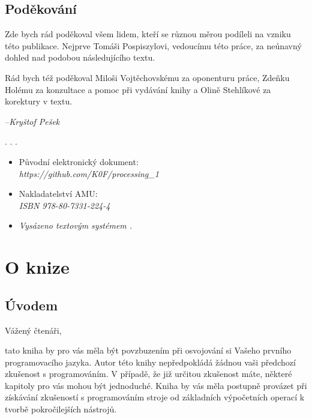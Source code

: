 \documentclass[10pt]{book}
\newcommand{\oddil}[1]{\section{#1}\index{#1}\label{#1}}
\begin{document}
\thispagestyle{empty}
\newpage
\oddil{Poděkování}
Zde bych rád poděkoval všem lidem, kteří se různou měrou podíleli na vzniku této publikace. Nejprve Tomáši Pospiszylovi, vedoucímu této práce, za neúnavný dohled nad podobou následujícího textu.

Rád bych též poděkoval Miloši Vojtěchovskému za oponenturu práce, Zdeňku Holému za konzultace a pomoc při vydávání knihy a Olině Stehlíkové za korektury v textu.


\vfill

\begin{flushright}
{\em \footnotesize{--Kryštof Pešek}}
\end{flushright}



\thispagestyle{empty}
.
\newpage
.
\thispagestyle{empty}
\newpage
.
\thispagestyle{empty}


\vfill

\begin{itemize}
\item
Původní elektronický dokument: \\
{\em https://github.com/K0F/processing\_1}
\item
Nakladatelství AMU: \\
{\em ISBN 978-80-7331-224-4}
\item
{\em Vysázeno textovým systémem \XeLaTeX.}

\end{itemize}



\thispagestyle{empty}



\tableofcontents


\chapter{O knize}



\vfill
\thispagestyle{empty}



\oddil{Úvodem}




Vážený čtenáři,

tato kniha by pro vás měla být povzbuzením při osvojování si Vašeho prvního programovacího jazyka. Autor této knihy nepředpokládá žádnou vaši předchozí zkušenost s programováním. V případě, že již určitou zkušenost máte, některé kapitoly pro vás mohou být jednoduché. Kniha by vás měla postupně provázet při získávání zkušeností s programováním stroje od základních výpočetních operací k tvorbě pokročilejších nástrojů.
\end{document}
